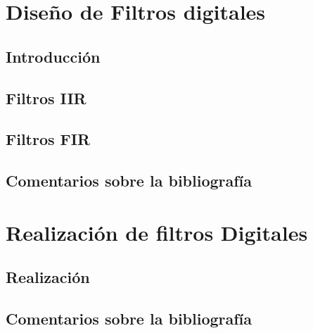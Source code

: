 \documentclass[oneside,a4paper,10pt]{scrbook}
\begin{document}
	\chapter{Diseño de Filtros digitales}{
	
		\section{Introducción}
   		{
    						
		}
		
		\clearpage
		
		\section{Filtros IIR}
   		{
    							
		}
		
		\clearpage
		
		\section{Filtros FIR}
   		{
    							
		}
		
		\clearpage
		
		\section{Comentarios sobre la bibliografía}
	   	{
    							
		}
	}
	
	\clearpage
	
	\chapter{Realización de filtros Digitales}
	{
		\section{Realización}
		{
			
		}
		
		\clearpage	
		
		\section{Comentarios sobre la bibliografía}
		{
			
		}	
	}
	
	\clearpage
\end{document}
